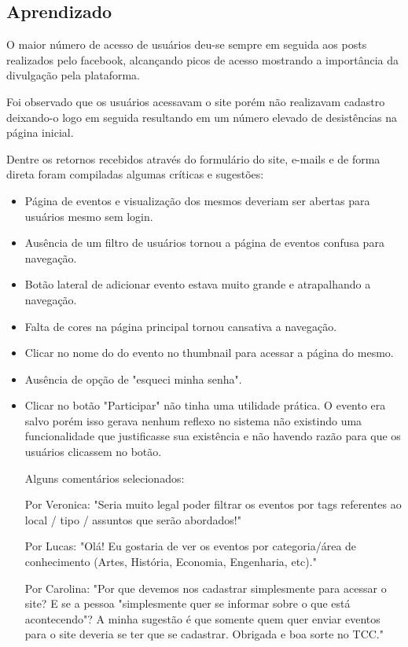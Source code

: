\subsection{Aprendizado}
\par O maior número de acesso de usuários deu-se sempre em seguida aos posts realizados pelo facebook, alcançando picos de acesso mostrando a importância da divulgação pela plataforma.
\par Foi observado que os usuários acessavam o site porém não realizavam cadastro deixando-o logo em seguida resultando em um número elevado de desistências na página inicial.
\par Dentre os retornos recebidos através do formulário do site, e-mails e de forma direta foram compiladas algumas críticas e sugestões:
\begin{itemize}
\item Página de eventos e visualização dos mesmos deveriam ser abertas para usuários mesmo sem login.
\item Ausência de um filtro de usuários tornou a página de eventos confusa para navegação.
\item Botão lateral de adicionar evento estava muito grande e atrapalhando a navegação.
\item Falta de cores na página principal tornou cansativa a navegação.
\item Clicar no nome do do evento no thumbnail para acessar a página do mesmo.
\item Ausência de opção de "esqueci minha senha".
\item Clicar no botão "Participar" não tinha uma utilidade prática. O evento era salvo porém isso gerava nenhum reflexo no sistema não existindo uma funcionalidade que justificasse sua existência e não havendo razão para que os usuários clicassem no botão.
\par Alguns comentários selecionados:

\par Por Veronica: "Seria muito legal poder filtrar os eventos por tags referentes ao local / tipo / assuntos que serão abordados!"

\par Por Lucas: "Olá! Eu gostaria de ver os eventos por categoria/área de conhecimento (Artes, História, Economia, Engenharia, etc)."

\par Por Carolina: "Por que devemos nos cadastrar simplesmente para acessar o site? E se a pessoa "simplesmente quer se informar sobre o que está acontecendo"? A minha sugestão é que somente quem quer enviar eventos para o site deveria se ter que se cadastrar. Obrigada e boa sorte no TCC."


\end{itemize}
